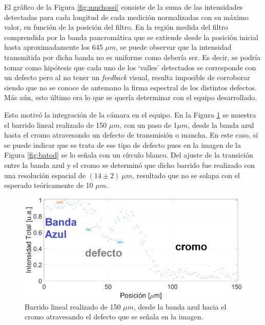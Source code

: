 El gráfico de la Figura \ref{fig:muchossi} consiste de la suma de las intensidades detectadas para cada longitud de cada medición normalizadas con su máximo valor, en función de la posición del filtro. En la región medida del filtro comprendida por la banda pancromática que se extiende desde la posición inicial hasta aproximadamente los 645 $\mu m$, se puede observar que la intensidad transmitida por dicha banda no es uniforme como debería ser. Es decir, se podría tomar como hipótesis que cada uno de los `valles' detectados se corresponde con un defecto pero al no tener un \textit{feedback} visual, resulta imposible de corroborar siendo que no se conoce de antemano la firma espectral de los distintos defectos. Más aún, esto último era lo que se quería determinar con el equipo desarrollado.  

Esto motivó la integración de la cámara en el equipo. En la Figura \ref{fig:barinted} se muestra el barrido lineal realizado de 150 $\mu m$, con un paso de 1$\mu m$, desde la banda azul hasta el cromo atravesando un defecto de transmisión o mancha. En este caso, sí se puede indicar que se trata de ese tipo de defecto pues en la imagen de la Figura \ref{fig:batod} se lo señala con un círculo blanco. Del ajuste de la transición entre la banda azul y el cromo se determinó que dicho barrido fue realizado con una resolución espacial de $(14 \pm 2)~\mu m$, resultado que no se solapa con el esperado teóricamente de 10 $\mu m$.

 \begin{figure}[H]
	\centering
	\includegraphics[width=1.0\textwidth]{Figs/microespectrometro/inten_totaldefecto.png}
	\caption{Barrido lineal realizado de 150 $\mu m$, desde la banda azul hacia el cromo atravesando el defecto que se señala en la imagen.}
	\label{fig:barinted}
\end{figure}

